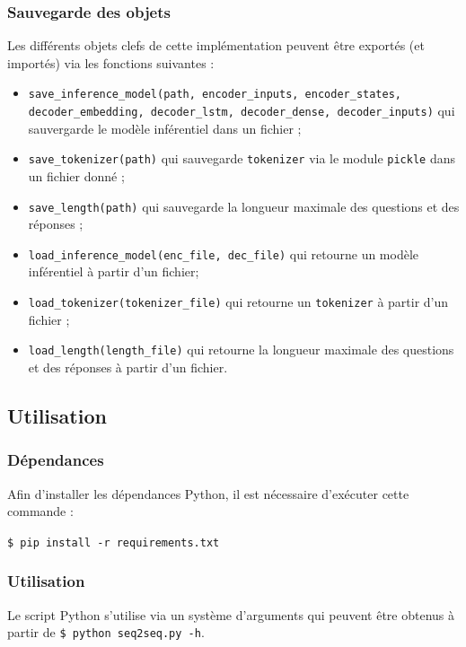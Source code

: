\documentclass[10pt,a4paper]{article}
\begin{document}
\subsubsection{Sauvegarde des objets}
Les différents objets clefs de cette implémentation peuvent être exportés (et importés) via les fonctions suivantes :
\begin{itemize}
	\item \texttt{save\_inference\_model(path, encoder\_inputs, encoder\_states, decoder\_embedding, decoder\_lstm, decoder\_dense, decoder\_inputs)} qui sauvergarde le modèle inférentiel dans un fichier ;
	\item \texttt{save\_tokenizer(path)} qui sauvegarde \texttt{tokenizer} via le module \texttt{pickle} dans un fichier donné ;
	\item \texttt{save\_length(path)} qui sauvegarde la longueur maximale des questions et des réponses ;
	\item \texttt{load\_inference\_model(enc\_file, dec\_file)} qui retourne un modèle inférentiel à partir d'un fichier;
	\item \texttt{load\_tokenizer(tokenizer\_file)} qui retourne un \texttt{tokenizer} à partir d'un fichier ;
	\item \texttt{load\_length(length\_file)} qui retourne la longueur maximale des questions et des réponses à partir d'un fichier.
\end{itemize}

\subsection{Utilisation}
\subsubsection{Dépendances}

Afin d'installer les dépendances Python, il est nécessaire d’exécuter cette commande :
\begin{center}
	\texttt{\$ pip install -r requirements.txt}
\end{center}
\subsubsection{Utilisation}
Le script Python s'utilise via un système d'arguments qui peuvent être obtenus à partir de \texttt{\$ python seq2seq.py -h}.
\end{document}
